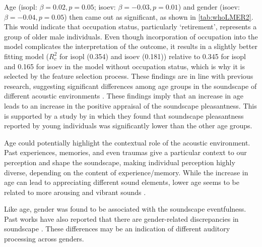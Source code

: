 Age (\gls{isopl}: $\beta=0.02, p=0.05$; \gls{isoev}: $\beta=-0.03, p=0.01$) and gender (\gls{isoev}: $\beta=-0.04, p=0.05$) then came out as significant, as shown in \cref{tab:whoLMER2}. This would indicate that occupation status, particularly `retirement', represents a group of older male individuals. Even though incorporation of occupation into the model complicates the interpretation of the outcome, it results in a slightly better fitting model ($R^2_c$ for \gls{isopl} (0.354) and \gls{isoev} (0.181)) relative to 0.345 for \gls{isopl} and 0.165 for \gls{isoev} in the model without occupation status, which is why it is selected by the feature selection process. These findings are in line with previous research, suggesting significant differences among age groups in the soundscape of different acoustic environments \citep{Ren2016Soundscape,Yang2005Acoustic}. These findings imply that an increase in age leads to an increase in the positive appraisal of the soundscape pleasantness. This is supported by a study by \citet{Aydin2016Assessment} in which they found that soundscape pleasantness reported by young individuals was significantly lower than the other age groups.

Age could potentially highlight the contextual role of the acoustic environment. Past experiences, memories, and even traumas give a particular context to our perception and shape the soundscape, making individual perception highly diverse, depending on the content of experience/memory. While the increase in age can lead to appreciating different sound elements, lower age seems to be related to more arousing and vibrant sounds \citep{Yang2005Acoustic}.

Like age, gender was found to be associated with the soundscape eventfulness. Past works have also reported that there are gender-related discrepancies in soundscape \citep{Croome1977Noise,Yang2005Acoustic}. These differences may be an indication of different auditory processing across genders.


